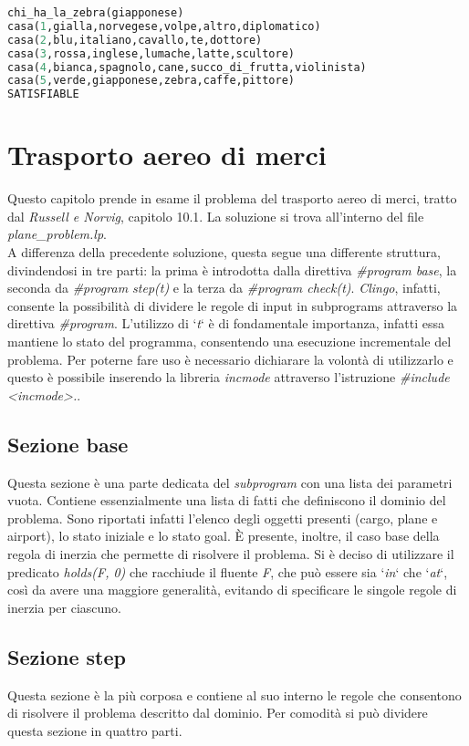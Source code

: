 \documentclass[12pt]{report}
\begin{document}
\begin{lstlisting}[language=lisp]
chi_ha_la_zebra(giapponese)
casa(1,gialla,norvegese,volpe,altro,diplomatico)
casa(2,blu,italiano,cavallo,te,dottore)
casa(3,rossa,inglese,lumache,latte,scultore)
casa(4,bianca,spagnolo,cane,succo_di_frutta,violinista)
casa(5,verde,giapponese,zebra,caffe,pittore)
SATISFIABLE
\end{lstlisting}

\chapter{Trasporto aereo di merci}
Questo capitolo prende in esame il problema del trasporto aereo di merci, tratto dal \emph{Russell e Norvig}, capitolo 10.1.
La soluzione si trova all'interno del file \emph{plane\_problem.lp}.\\
A differenza della precedente soluzione, questa segue una differente struttura, divindendosi in tre parti: la prima è introdotta dalla direttiva \emph{\#program base}, la seconda da \emph{\#program step(t)} e la terza da \emph{\#program check(t)}. \emph{Clingo}, infatti, consente la possibilità di dividere le regole di input in subprograms attraverso la direttiva \emph{\#program}.
L'utilizzo di `\emph{t}` è di fondamentale importanza, infatti essa mantiene lo stato del programma, consentendo una esecuzione incrementale del problema. 
Per poterne fare uso è necessario dichiarare la volontà di utilizzarlo e questo è possibile inserendo la libreria \emph{incmode} attraverso l'istruzione \emph{\#include <incmode>.}.

\section{Sezione base}
Questa sezione è una parte dedicata del \emph{subprogram} con una lista dei parametri vuota.
Contiene essenzialmente una lista di fatti che definiscono il dominio del problema. Sono riportati infatti l'elenco degli oggetti presenti (cargo, plane e airport), lo stato iniziale e lo stato goal.
È presente, inoltre, il caso base della regola di inerzia che permette di risolvere il problema. Si è deciso di utilizzare il predicato \emph{holds(F, 0)} che racchiude il fluente \emph{F}, che può essere sia `\emph{in}` che `\emph{at}`, così da avere una maggiore generalità, evitando di specificare le singole regole di inerzia per ciascuno.

\section{Sezione step}
Questa sezione è la più corposa e contiene al suo interno le regole che consentono di risolvere il problema descritto dal dominio.
Per comodità si può dividere questa sezione in quattro parti.
\end{document}
